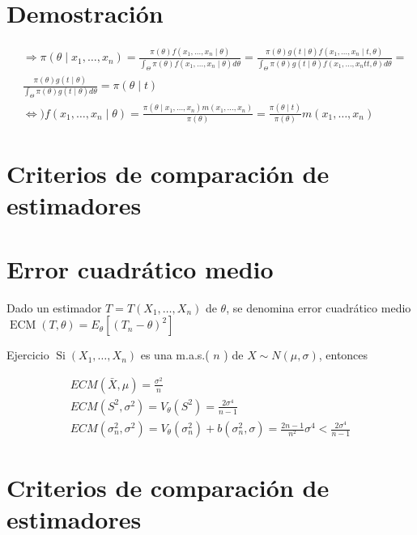 \section*{Demostración}
$$
\begin{aligned}
& \Rightarrow \pi\left(\theta \mid x_{1}, \ldots, x_{n}\right)=\frac{\pi(\theta) f\left(x_{1}, \ldots, x_{n} \mid \theta\right)}{\int_{\Theta} \pi(\theta) f\left(x_{1}, \ldots, x_{n} \mid \theta\right) d \theta}=\frac{\pi(\theta) g(t \mid \theta) f\left(x_{1}, \ldots, x_{n} \mid t, \theta\right)}{\int_{\Theta} \pi(\theta) g(t \mid \theta) f\left(x_{1}, \ldots, x_{n} t t, \theta\right) d \theta}= \\
& \frac{\pi(\theta) g(t \mid \theta)}{\int_{\Theta} \pi(\theta) g(t \mid \theta) d \theta}=\pi(\theta \mid t) \\
&\Leftrightarrow) f\left(x_{1}, \ldots, x_{n} \mid \theta\right)=\frac{\pi\left(\theta \mid x_{1}, \ldots, x_{n}\right) m\left(x_{1}, \ldots, x_{n}\right)}{\pi(\theta)}=\frac{\pi(\theta \mid t)}{\pi(\theta)} m\left(x_{1}, \ldots, x_{n}\right)
\end{aligned}
$$

\section*{Criterios de comparación de estimadores}
\section*{Error cuadrático medio}
Dado un estimador $T=T\left(X_{1}, \ldots, X_{n}\right)$ de $\theta$, se denomina error cuadrático medio $\operatorname{ECM}(T, \theta)=E_{\theta}\left[\left(T_{n}-\theta\right)^{2}\right]$

Ejercicio $\operatorname{Si}\left(X_{1}, \ldots, X_{n}\right)$ es una m.a.s.( $n$ ) de $X \sim N(\mu, \sigma)$, entonces

$$
\begin{gathered}
E C M(\bar{X}, \mu)=\frac{\sigma^{2}}{n} \\
E C M\left(S^{2}, \sigma^{2}\right)=V_{\theta}\left(S^{2}\right)=\frac{2 \sigma^{4}}{n-1} \\
E C M\left(\sigma_{n}^{2}, \sigma^{2}\right)=V_{\theta}\left(\sigma_{n}^{2}\right)+b\left(\sigma_{n}^{2}, \sigma\right)=\frac{2 n-1}{n^{2}} \sigma^{4}<\frac{2 \sigma^{4}}{n-1}
\end{gathered}
$$

\section*{Criterios de comparación de estimadores}
